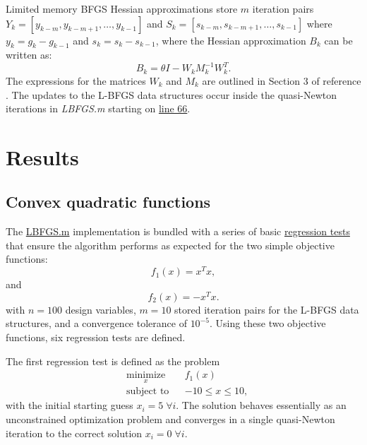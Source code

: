\documentclass[11pt]{article}
\begin{document}
Limited memory BFGS Hessian approximations store $m$ iteration
pairs $Y_k = [y_{k-m}, y_{k-m+1}, \dots, y_{k-1}]$ and
$S_k = [s_{k-m}, s_{k-m+1}, \dots, s_{k-1}]$ where
$y_k = g_k - g_{k-1}$ and $s_k = s_k - s_{k-1}$, where the
Hessian approximation $B_k$ can be written as:
%
\begin{equation}
B_k = \theta I - W_k M^{-1}_k W^T_k.
\end{equation}
%
The expressions for the matrices $W_k$ and $M_k$ are
outlined in Section 3 of reference \cite{lbfgsb}. The updates
to the L-BFGS data structures occur inside the quasi-Newton
iterations in \emph{LBFGS.m} starting on
\href{https://github.com/bgranzow/L-BFGS-B/blob/master/LBFGSB.m#L66}{line 66}.

\section{Results}

\subsection{Convex quadratic functions}

The \href{https://github.com/bgranzow/L-BFGS-B/blob/master/test_LBFGSB.m}
{LBFGS.m} implementation is bundled with a series of basic
\href{https://github.com/bgranzow/L-BFGS-B/blob/master/test_LBFGSB.m}
{regression tests} that ensure the algorithm performs as
expected for the two simple objective functions:
%
\begin{equation}
f_1(x) = x^T x,
\end{equation}
and
\begin{equation}
f_2(x) = - x^T x.
\end{equation}
%
with $n = 100$ design variables, $m=10$ stored iteration
pairs for the L-BFGS data structures, and a convergence
tolerance of $10^{-5}$. Using these two objective
functions, six regression tests are defined.

The first regression test is defined as the problem
%
\begin{equation}
\begin{aligned}
& \underset{x}{\text{minimize}}
& & f_1(x) \\
& \text{subject to}
& & -10 \leq x \leq 10,
\end{aligned}
\end{equation}
%
with the initial starting guess $x_i = 5 \; \forall i$.
The solution behaves essentially as an unconstrained
optimization problem and converges in a single quasi-Newton
iteration to the correct solution
$x_i = 0 \; \forall i$.
\end{document}
